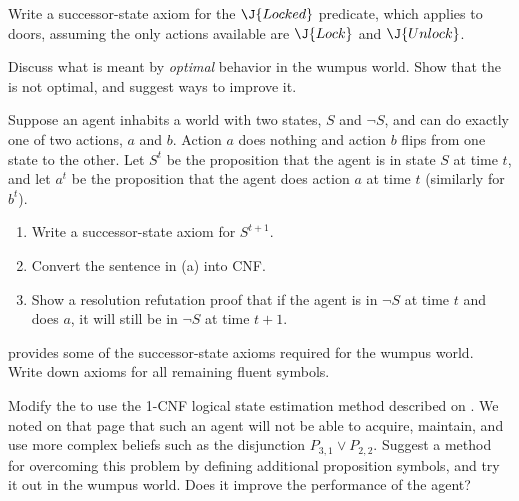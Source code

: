 
\begin{uexercise} %
Write a successor-state axiom for the \(\J{Locked}\) predicate, 
which applies to doors, assuming the only actions available are \(\J{Lock}\)
and \(\J{Unlock}\).
\end{uexercise} 

\begin{iexercise}
Discuss what is meant by {\em optimal} behavior in the wumpus world.
Show that the  is not optimal,
and suggest ways to improve it.
\end{iexercise} 

\begin{iexercise}%
Suppose an agent inhabits a world with two states, \(S\) and \(\lnot S\), and
can do exactly one of two actions, \(a\) and \(b\). Action \(a\) does nothing and action \(b\) flips from
one state to the other. Let \(S^t\) be the proposition that the agent is in state \(S\) at time \(t\),
and let \(a^t\) be the proposition that the agent does action \(a\) at time \(t\) (similarly for \(b^t\)).
\begin{enumerate}
\item  Write a successor-state axiom for \(S^{t+1}\).
\item  Convert the sentence in (a) into CNF.
\item  Show a resolution refutation proof that if the agent is in \(\lnot S\) at time \(t\) and does \(a\), 
it will still be in \(\lnot S\) at time \(t+1\).
\end{enumerate}
\end{iexercise} 

\begin{exercise}
 provides some of the successor-state
axioms required for the wumpus world. Write down axioms for all
remaining fluent symbols.
\end{exercise} 

\begin{exercise}\prgex%
Modify the  to use the 1-CNF logical state estimation method described on 
. We noted on that page that such an
agent will not be able to acquire, maintain, and use more complex
beliefs such as the disjunction \(P_{3,1}\lor P_{2,2}\). Suggest a
method for overcoming this problem by defining additional proposition
symbols, and try it out in the wumpus world. Does it improve the
performance of the agent?
\end{exercise} 



